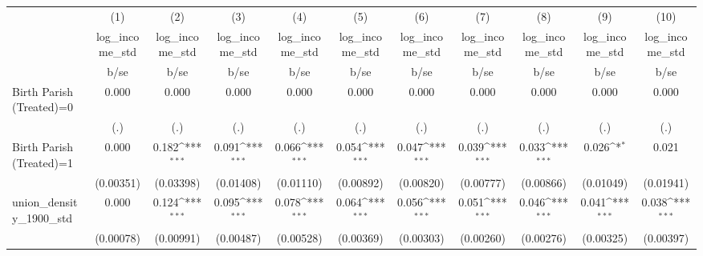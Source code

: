 {
\def\sym#1{\ifmmode^{#1}\else\(^{#1}\)\fi}
\begin{tabular}{l*{10}{c}}
\hline\hline
                    &\multicolumn{1}{c}{(1)}&\multicolumn{1}{c}{(2)}&\multicolumn{1}{c}{(3)}&\multicolumn{1}{c}{(4)}&\multicolumn{1}{c}{(5)}&\multicolumn{1}{c}{(6)}&\multicolumn{1}{c}{(7)}&\multicolumn{1}{c}{(8)}&\multicolumn{1}{c}{(9)}&\multicolumn{1}{c}{(10)}\\
                    &\multicolumn{1}{c}{log\_income\_std}&\multicolumn{1}{c}{log\_income\_std}&\multicolumn{1}{c}{log\_income\_std}&\multicolumn{1}{c}{log\_income\_std}&\multicolumn{1}{c}{log\_income\_std}&\multicolumn{1}{c}{log\_income\_std}&\multicolumn{1}{c}{log\_income\_std}&\multicolumn{1}{c}{log\_income\_std}&\multicolumn{1}{c}{log\_income\_std}&\multicolumn{1}{c}{log\_income\_std}\\
                    &        b/se         &        b/se         &        b/se         &        b/se         &        b/se         &        b/se         &        b/se         &        b/se         &        b/se         &        b/se         \\
\hline
Birth Parish (Treated)=0&       0.000         &       0.000         &       0.000         &       0.000         &       0.000         &       0.000         &       0.000         &       0.000         &       0.000         &       0.000         \\
                    &         (.)         &         (.)         &         (.)         &         (.)         &         (.)         &         (.)         &         (.)         &         (.)         &         (.)         &         (.)         \\
Birth Parish (Treated)=1&       0.000         &       0.182\sym{***}&       0.091\sym{***}&       0.066\sym{***}&       0.054\sym{***}&       0.047\sym{***}&       0.039\sym{***}&       0.033\sym{***}&       0.026\sym{*}  &       0.021         \\
                    &   (0.00351)         &   (0.03398)         &   (0.01408)         &   (0.01110)         &   (0.00892)         &   (0.00820)         &   (0.00777)         &   (0.00866)         &   (0.01049)         &   (0.01941)         \\
union\_density\_1900\_std&       0.000         &       0.124\sym{***}&       0.095\sym{***}&       0.078\sym{***}&       0.064\sym{***}&       0.056\sym{***}&       0.051\sym{***}&       0.046\sym{***}&       0.041\sym{***}&       0.038\sym{***}\\
                    &   (0.00078)         &   (0.00991)         &   (0.00487)         &   (0.00528)         &   (0.00369)         &   (0.00303)         &   (0.00260)         &   (0.00276)         &   (0.00325)         &   (0.00397)         \\

\end{tabular}}
